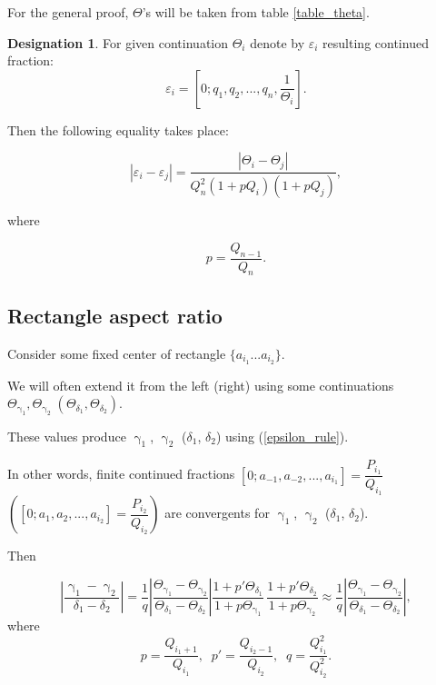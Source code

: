 \documentclass[a4paper, 12pt]{article}
\let\oldref\ref
\renewcommand{\ref}[1]{(\oldref{#1})}
\theoremstyle{definition}
\theoremstyle{definition}
\newtheorem*{designation}{Designation}
\theoremstyle{proposition}
\theoremstyle{lemma}
\newcommand{\g}{\upgamma}
\renewcommand{\d}{\delta}
\newcommand{\T}{\Theta}
\begin{document}
For the general proof, $\T$'s will be taken from table \oldref{table_theta}.

\begin{designation}
	For given continuation $\T_i$ denote by $\varepsilon_i$ resulting continued fraction:
	\begin{equation}\tag{3.4}\label{epsilon_rule}
		\varepsilon_i = [0; q_1, q_2, ..., q_n, \frac{1}{\T_i}].
	\end{equation}
\end{designation}

Then the following equality takes place:

\begin{equation}\tag{3.5}\label{varepsilons_difference}
	| \varepsilon_i - \varepsilon_j | = 
	\dfrac{| \T_i - \T_j |}
	{Q_n^2 \left(1 + pQ_i\right) \left(1 + pQ_j\right)},
\end{equation}

where

\begin{equation*}
	p = \dfrac{Q_{n-1}}{Q_n}.
\end{equation*}

\subsection{Rectangle aspect ratio}

Consider some fixed center of rectangle $\{a_{i_1} ... a_{i_2}\}$.

We will often extend it from the left (right) using some continuations
$\T_{\g_1}, \T_{\g_2}\; (\T_{\d_1}, \T_{\d_2})$.

These values produce $\g_1$, $\g_2$ ($\d_1$, $\d_2$)
using \ref{epsilon_rule}.

In other words, finite continued fractions
$[0; a_{-1}, a_{-2}, ..., a_{i_1}] = \dfrac{P_{i_1}}{Q_{i_1}}$
$\left([0; a_{1}, a_{2}, ..., a_{i_2}] = \dfrac{P_{i_2}}{Q_{i_2}}\right)$
are convergents for $\g_1$, $\g_2$ ($\d_1$, $\d_2$).

Then

\begin{equation}%
	\left| \dfrac{\g_1 - \g_2}{\d_1 - \d_2} \right|
	=
	\dfrac{1}{q}
	\left| \dfrac{\T_{\g_1} - \T_{\g_2}}
	{\T_{\d_1} - \T_{\d_2}} \right|
	\dfrac{1 + p' \T_{\d_1}}{1 + p \T_{\g_1}}\,
	\dfrac{1 + p' \T_{\d_2}}{1 + p \T_{\g_2}}
	\approx
	\dfrac{1}{q}
	\left| \dfrac{\T_{\g_1} - \T_{\g_2}}
	{\T_{\d_1} - \T_{\d_2}} \right|,
\end{equation}
where
\begin{equation*}
	p = \dfrac{Q_{i_1 + 1}}{Q_{i_1}},\;\;
	p' = \dfrac{Q_{i_2 - 1}}{Q_{i_2}},\;\;
	q = \dfrac{Q_{i_1}^2}{Q_{i_2}^2}.
\end{equation*}
\end{document}
